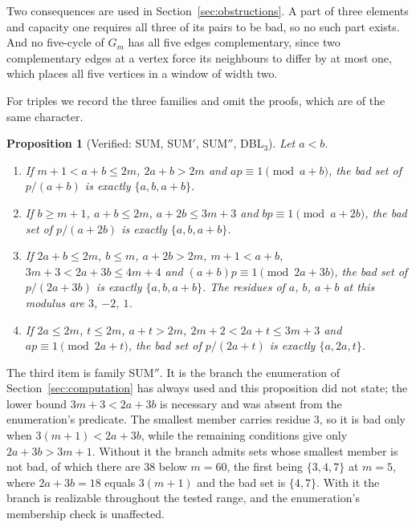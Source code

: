 \documentclass[11pt]{amsart}
\theoremstyle{plain}
\newtheorem{proposition}[theorem]{Proposition}
\theoremstyle{definition}
\begin{document}
Two consequences are used in Section~\ref{sec:obstructions}. A part of three elements and capacity
one requires all three of its pairs to be bad, so no such part exists. And no five-cycle of $G_m$ has
all five edges complementary, since two complementary edges at a vertex force its neighbours to
differ by at most one, which places all five vertices in a window of width two.

For triples we record the three families and omit the proofs, which are of the same character.

\begin{proposition}[Verified: SUM, SUM$'$, SUM$''$, DBL$_3$]\label{prop:triples}
Let $a < b$.
\begin{enumerate}
\item If $m+1 < a+b \le 2m$, $2a+b > 2m$ and $a p \equiv 1 \pmod{a+b}$, the bad set of $p/(a+b)$ is
  exactly $\{a, b, a+b\}$.
\item If $b \ge m+1$, $a + b \le 2m$, $a + 2b \le 3m+3$ and $b p \equiv 1 \pmod{a+2b}$, the bad set
  of $p/(a+2b)$ is exactly $\{a, b, a+b\}$.
\item If $2a+b \le 2m$, $b \le m$, $a+2b > 2m$, $m+1 < a+b$, $3m+3 < 2a+3b \le 4m+4$ and
  $(a+b)p \equiv 1 \pmod{2a+3b}$, the bad set of $p/(2a+3b)$ is exactly $\{a, b, a+b\}$. The
  residues of $a$, $b$, $a+b$ at this modulus are $3$, $-2$, $1$.
\item If $2a \le 2m$, $t \le 2m$, $a + t > 2m$, $2m+2 < 2a+t \le 3m+3$ and $ap \equiv 1
  \pmod{2a+t}$, the bad set of $p/(2a+t)$ is exactly $\{a, 2a, t\}$.
\end{enumerate}
\end{proposition}

The third item is family SUM$''$. It is the branch the enumeration of
Section~\ref{sec:computation} has always used and this proposition did not state; the lower bound
$3m+3 < 2a+3b$ is necessary and was absent from the enumeration's predicate. The smallest member
carries residue $3$, so it is bad only when $3(m+1) < 2a+3b$, while the remaining conditions give
only $2a+3b > 3m+1$. Without it the branch admits sets whose smallest member is not bad, of which
there are $38$ below $m = 60$, the first being $\{3,4,7\}$ at $m = 5$, where $2a+3b = 18$ equals
$3(m+1)$ and the bad set is $\{4,7\}$. With it the branch is realizable throughout the tested
range, and the enumeration's membership check is unaffected.
\end{document}
